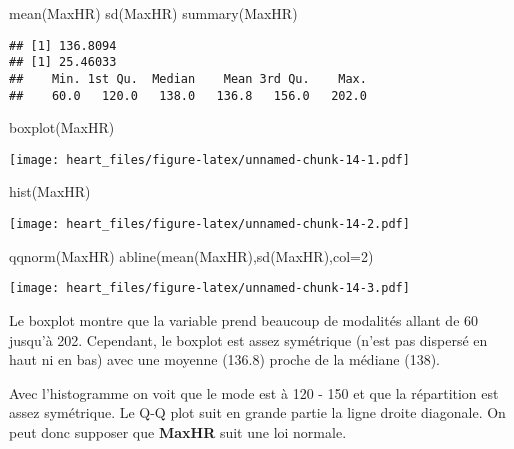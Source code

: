 \documentclass[
]{article}
\newenvironment{Shaded}{\begin{snugshade}}{\end{snugshade}}
\newcommand{\AttributeTok}[1]{\textcolor[rgb]{0.77,0.63,0.00}{#1}}
\newcommand{\DecValTok}[1]{\textcolor[rgb]{0.00,0.00,0.81}{#1}}
\newcommand{\FunctionTok}[1]{\textcolor[rgb]{0.00,0.00,0.00}{#1}}
\newcommand{\NormalTok}[1]{#1}
\begin{document}
\begin{Shaded}
\begin{Highlighting}[]
\FunctionTok{mean}\NormalTok{(MaxHR)}
\FunctionTok{sd}\NormalTok{(MaxHR)}
\FunctionTok{summary}\NormalTok{(MaxHR)}
\end{Highlighting}
\end{Shaded}

\begin{verbatim}
## [1] 136.8094
## [1] 25.46033
##    Min. 1st Qu.  Median    Mean 3rd Qu.    Max. 
##    60.0   120.0   138.0   136.8   156.0   202.0
\end{verbatim}

\begin{Shaded}
\begin{Highlighting}[]
\FunctionTok{boxplot}\NormalTok{(MaxHR)}
\end{Highlighting}
\end{Shaded}

\texttt{[image: heart\_files/figure-latex/unnamed-chunk-14-1.pdf]}

\begin{Shaded}
\begin{Highlighting}[]
\FunctionTok{hist}\NormalTok{(MaxHR)}
\end{Highlighting}
\end{Shaded}

\texttt{[image: heart\_files/figure-latex/unnamed-chunk-14-2.pdf]}

\begin{Shaded}
\begin{Highlighting}[]
\FunctionTok{qqnorm}\NormalTok{(MaxHR)}
\FunctionTok{abline}\NormalTok{(}\FunctionTok{mean}\NormalTok{(MaxHR),}\FunctionTok{sd}\NormalTok{(MaxHR),}\AttributeTok{col=}\DecValTok{2}\NormalTok{)}
\end{Highlighting}
\end{Shaded}

\texttt{[image: heart\_files/figure-latex/unnamed-chunk-14-3.pdf]}

Le boxplot montre que la variable prend beaucoup de modalités allant de
60 jusqu'à 202. Cependant, le boxplot est assez symétrique (n'est pas
dispersé en haut ni en bas) avec une moyenne (136.8) proche de la
médiane (138).

Avec l'histogramme on voit que le mode est à 120 - 150 et que la
répartition est assez symétrique. Le Q-Q plot suit en grande partie la
ligne droite diagonale. On peut donc supposer que \textbf{MaxHR} suit
une loi normale.
\end{document}
